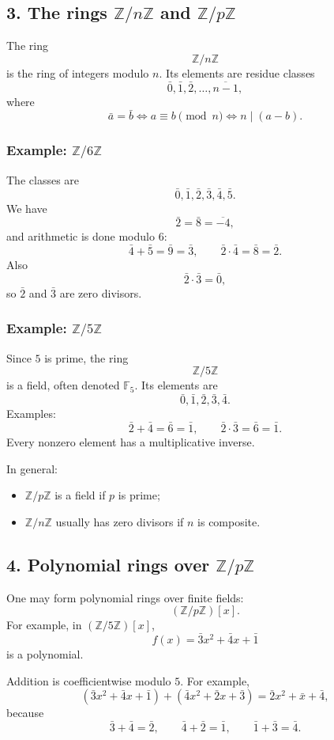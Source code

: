 \documentclass[12pt,a4paper,oneside]{report}
\theoremstyle{notespace}
\begin{document}
	\subsection{3. The rings \(\mathbb Z/n\mathbb Z\) and \(\mathbb Z/p\mathbb Z\)}
	
	The ring
	\[
	\mathbb Z/n\mathbb Z
	\]
	is the ring of integers modulo \(n\). Its elements are residue classes
	\[
	\bar 0,\bar 1,\bar 2,\dots,\overline{n-1},
	\]
	where
	\[
	\bar a=\bar b
	\iff
	a\equiv b\pmod n
	\iff
	n\mid(a-b).
	\]
	
	\subsubsection{Example: \(\mathbb Z/6\mathbb Z\)}
	The classes are
	\[
	\bar 0,\bar 1,\bar 2,\bar 3,\bar 4,\bar 5.
	\]
	We have
	\[
	\bar 2=\bar 8=\overline{-4},
	\]
	and arithmetic is done modulo \(6\):
	\[
	\bar 4+\bar 5=\bar 9=\bar 3,
	\qquad
	\bar 2\cdot \bar 4=\bar 8=\bar 2.
	\]
	Also
	\[
	\bar 2\cdot \bar 3=\bar 0,
	\]
	so \(\bar 2\) and \(\bar 3\) are zero divisors.
	
	\subsubsection{Example: \(\mathbb Z/5\mathbb Z\)}
	Since \(5\) is prime, the ring
	\[
	\mathbb Z/5\mathbb Z
	\]
	is a field, often denoted \(\mathbb F_5\). Its elements are
	\[
	\bar 0,\bar 1,\bar 2,\bar 3,\bar 4.
	\]
	Examples:
	\[
	\bar 2+\bar 4=\bar 6=\bar 1,
	\qquad
	\bar 2\cdot \bar 3=\bar 6=\bar 1.
	\]
	Every nonzero element has a multiplicative inverse.
	
	In general:
	\begin{itemize}
		\item \(\mathbb Z/p\mathbb Z\) is a field if \(p\) is prime;
		\item \(\mathbb Z/n\mathbb Z\) usually has zero divisors if \(n\) is composite.
	\end{itemize}
	
	\subsection{4. Polynomial rings over \(\mathbb Z/p\mathbb Z\)}
	
	One may form polynomial rings over finite fields:
	\[
	(\mathbb Z/p\mathbb Z)[x].
	\]
	For example, in \((\mathbb Z/5\mathbb Z)[x]\),
	\[
	f(x)=\bar 3x^2+\bar 4x+\bar 1
	\]
	is a polynomial.
	
	Addition is coefficientwise modulo \(5\). For example,
	\[
	(\bar 3x^2+\bar 4x+\bar 1)+(\bar 4x^2+\bar 2x+\bar 3)
	=
	\bar 2x^2+\bar x+\bar 4,
	\]
	because
	\[
	\bar 3+\bar 4=\bar 2,\qquad
	\bar 4+\bar 2=\bar 1,\qquad
	\bar 1+\bar 3=\bar 4.
	\]
	
\end{document}
